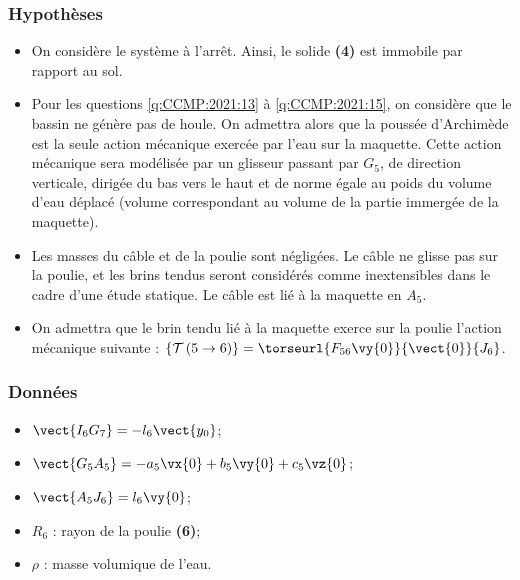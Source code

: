 \subsubsection*{Hypothèses}
\begin{itemize}
\item On considère le système à l’arrêt. Ainsi, le solide \textbf{(4)} est immobile par rapport au sol.
\item Pour les questions \ref{q:CCMP:2021:13} à \ref{q:CCMP:2021:15}, on considère que le bassin ne génère pas de houle. On admettra alors que la poussée d’Archimède est la seule action mécanique exercée par l’eau sur la maquette. Cette action mécanique sera modélisée par un glisseur passant par $G_5$, de direction verticale, dirigée du bas vers le haut et de norme égale au poids du volume d’eau déplacé (volume correspondant au volume de la partie immergée de la maquette).
\item Les masses du câble et de la poulie sont négligées. Le câble ne glisse pas sur la poulie, et les brins tendus seront considérés comme inextensibles dans le cadre d’une étude statique. Le câble est lié à la maquette en $A_5$.
\item On admettra que le brin tendu lié à la maquette exerce sur la poulie l’action mécanique suivante :
$\left\{ \mathcal{T} \left(5\to 6 \right) \right\} = \torseurl{F_{56}\vy{0}}{\vect{0}}{J_6}$.
\end{itemize}


\subsubsection*{Données}
\begin{itemize}
    \item $\vect{I_6 G_7}  = -l_6 \vect{y_0}$;
    \item $\vect{G_5 A_5} = -a_5\vx{0}+b_5 \vy{0}+c_5 \vz{0}$;
    \item $\vect{A_5 J_6 } = l_6 \vy{0}$;
    \item $R_6$ : rayon de la poulie \textbf{(6)};
    \item $\rho$ : masse volumique de l’eau.
\end{itemize} 


\ifprof
\begin{corrige}
\end{corrige}
\else
\fi

